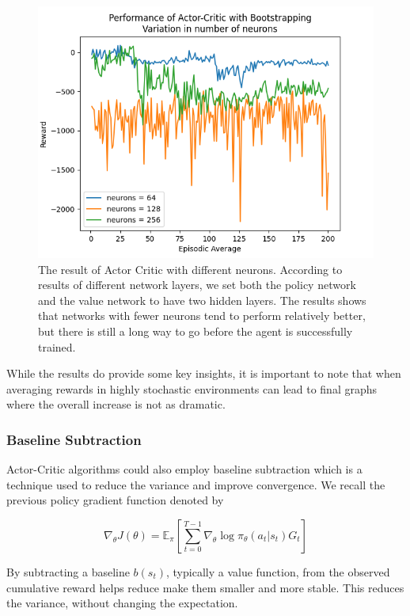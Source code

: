 \documentclass{article}
\begin{document}
\begin{figure}[h!]
\centering
\includegraphics[width=0.9\linewidth]{Report/images/08.Performance_of_Actor_Critic_BS_Neurons.png}
\caption{\label{fig:ActorCritic for different Neurons}The result of Actor Critic with different neurons. According to results of different network layers, we set both the policy network and the value network to have two hidden layers. The results shows that networks with fewer neurons tend to perform relatively better, but there is still a long way to go before the agent is successfully trained.}
\end{figure}

While the results do provide some key insights, it is important to note that when averaging rewards in highly stochastic environments can lead to final graphs where the overall increase is not as dramatic.


\subsubsection{Baseline Subtraction}
Actor-Critic algorithms could also employ baseline subtraction which is a technique used to reduce the variance and improve convergence. We recall the previous policy gradient function denoted by 

\begin{equation*}
\nabla_\theta J(\theta) = \mathbb{E}_\pi[\sum _{t=0}^{T-1}  \nabla_\theta \log\pi_\theta (a_t|s_t)G_t]
\end{equation*}

By subtracting a baseline $b(s_t)$, typically a value function,  from the observed cumulative reward helps reduce make them smaller and more stable. This reduces the variance, without changing the expectation. \cite{david-ucl-lecture}
\end{document}
